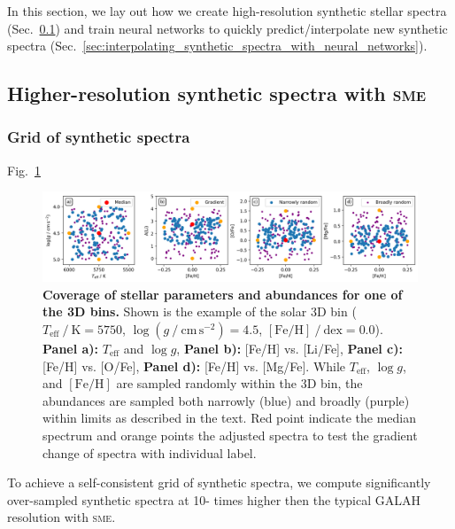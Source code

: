 \documentclass[
  journal=pasa,
  manuscript=research-paper, %
  year=2023,
  volume=37
]{cup-journal}
\newcommand{\Teff}{$T_\mathrm{eff}$\xspace}
\newcommand{\logg}{$\log g$\xspace}
\newcommand{\feh}{$\mathrm{[Fe/H]}$\xspace}
\newcommand{\sme}{\textsc{sme}\xspace}
\begin{document}
In this section, we lay out how we create high-resolution synthetic stellar spectra (Sec.~\ref{sec:higher_resolution_synthetic_spectra}) and train neural networks to quickly predict/interpolate new synthetic spectra (Sec.~\ref{sec:interpolating_synthetic_spectra_with_neural_networks}).

\subsection{Higher-resolution synthetic spectra with \sme}
\label{sec:higher_resolution_synthetic_spectra}

\subsubsection{Grid of synthetic spectra} \label{subsubsec:spectrum_grid}

Fig.~\ref{fig:example_3d_bin_sample}

\begin{figure}[ht]
 \centering
 \includegraphics[width=\textwidth]{figures/example_3d_bin_sample.png}
 \caption{\textbf{Coverage of stellar parameters and abundances for one of the 3D bins.} Shown is the example of the solar 3D bin ($T_\mathrm{eff}~/~\mathrm{K} = 5750$, $\log (g~/~\mathrm{cm\,s^{-2}}) = 4.5$, $\mathrm{[Fe/H]}~/~\mathrm{dex} = 0.0$). \textbf{Panel a):} \Teff and \logg, \textbf{Panel b):} [Fe/H] vs. [Li/Fe], \textbf{Panel c):} [Fe/H] vs. [O/Fe], \textbf{Panel d):} [Fe/H] vs. [Mg/Fe]. While \Teff, \logg, and \feh are sampled randomly within the 3D bin, the abundances are sampled both narrowly (blue) and broadly (purple) within limits as described in the text. Red point indicate the median spectrum and orange points the adjusted spectra to test the gradient change of spectra with individual label.}
 \label{fig:example_3d_bin_sample}
\end{figure}

To achieve a self-consistent grid of synthetic spectra, we compute significantly over-sampled synthetic spectra at 10- times higher then the typical GALAH resolution with \sme.
\end{document}
